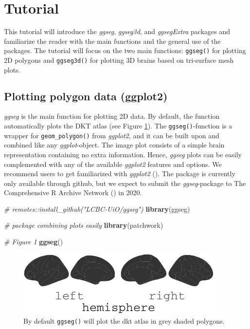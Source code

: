 \documentclass[fleqn,10pt]{wlpeerj} %
\newenvironment{Shaded}{\begin{snugshade}}{\end{snugshade}}
\newcommand{\CommentTok}[1]{\textcolor[rgb]{0.56,0.35,0.01}{\textit{#1}}}
\newcommand{\KeywordTok}[1]{\textcolor[rgb]{0.13,0.29,0.53}{\textbf{#1}}}
\newcommand{\NormalTok}[1]{#1}
\begin{document}
\hypertarget{tutorial}{%
\section{Tutorial}\label{tutorial}}

This tutorial will introduce the \emph{ggseg}, \emph{ggseg3d}, and \emph{ggsegExtra} packages and familiarize the reader with the main functions and the general use of the packages.
The tutorial will focus on the two main functions: \texttt{ggseg()} for plotting 2D polygons and \texttt{ggseg3d()} for plotting 3D brains based on tri-surface mesh plots.

\hypertarget{plotting-polygon-data-ggplot2}{%
\subsection{Plotting polygon data (ggplot2)}\label{plotting-polygon-data-ggplot2}}

\emph{ggseg} is the main function for plotting 2D data.
By default, the function automatically plots the DKT atlas (see Figure \ref{fig:init}).
The \texttt{ggseg()}-function is a wrapper for \texttt{geom\_polygon()} from \emph{ggplot2}, and it can be built upon and combined like any \emph{ggplot}-object.
The image plot consists of a simple brain representation containing no extra information.
Hence, \emph{ggseg} plots can be easily complemented with any of the available \emph{ggplot2} features and options.
We recommend users to get familiarized with \emph{ggplot2} (\citet{ggplot}).
The package is currently only available through github, but we expect to submit the \emph{ggseg}-package to The Comprehensive R Archive Network (\citet{cran}) in 2020.

\begin{Shaded}
\begin{Highlighting}[]
\CommentTok{\# remotes::install\_github("LCBC{-}UiO/ggseg")}
\KeywordTok{library}\NormalTok{(ggseg)}

\CommentTok{\# package combining plots easily}
\KeywordTok{library}\NormalTok{(patchwork)}

\CommentTok{\# Figure 1}
\KeywordTok{ggseg}\NormalTok{()}
\end{Highlighting}
\end{Shaded}

\begin{figure}
\centering
\includegraphics{msc_ggseg_files/figure-latex/init-1.pdf}
\caption{\label{fig:init}By default \texttt{ggseg()} will plot the dkt atlas in grey shaded polygons.}
\end{figure}
\end{document}

